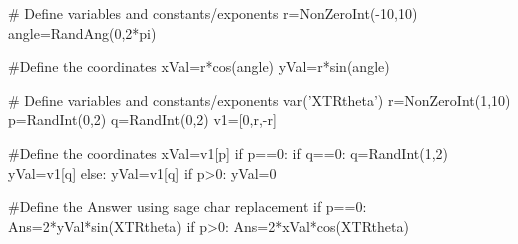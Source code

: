 
\begin{sagesilent}
# Define variables and constants/exponents
r=NonZeroInt(-10,10)
angle=RandAng(0,2*pi)

#Define the coordinates
xVal=r*cos(angle)
yVal=r*sin(angle)
\end{sagesilent}


\begin{sagesilent}
# Define variables and constants/exponents
var('XTRtheta')
r=NonZeroInt(1,10)
p=RandInt(0,2)
q=RandInt(0,2)
v1=[0,r,-r]

#Define the coordinates
xVal=v1[p]
if p==0:
   if q==0:
      q=RandInt(1,2)
      yVal=v1[q]
   else:
      yVal=v1[q]
if p>0:
   yVal=0

#Define the Answer using sage char replacement
if p==0:
   Ans=2*yVal*sin(XTRtheta)
if p>0:
   Ans=2*xVal*cos(XTRtheta)
\end{sagesilent}


